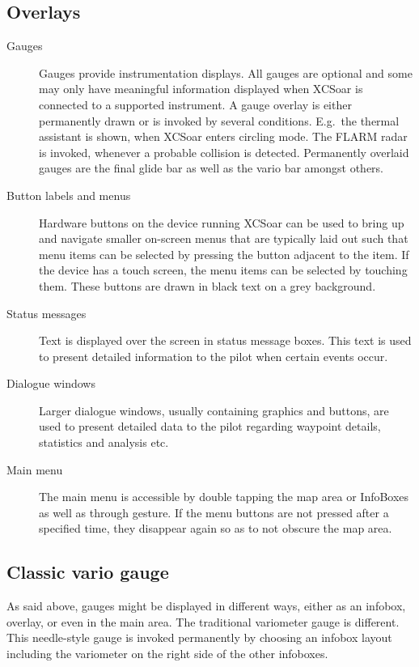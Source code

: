 \subsection*{Overlays}
\begin{description}
\item[Gauges]  Gauges provide instrumentation displays. All gauges are optional
and some may only have meaningful information displayed when XCSoar is
connected to a supported instrument.
A gauge overlay is either permanently drawn or is invoked by several 
conditions.  E.g.\ the thermal assistant is shown, when XCSoar enters circling
mode. The FLARM radar is invoked, whenever a probable collision is detected.
Permanently overlaid gauges are the final glide bar as well as the vario bar
amongst others.
\item[Button labels and menus] Hardware buttons on the device running XCSoar
can be used to bring up and navigate smaller on-screen menus that are
typically laid out such that menu items can be selected by pressing the
button adjacent to the item.  If the device has a touch screen, the menu
items can be selected by touching them.  These buttons are drawn in black
text on a grey background.
\item[Status messages] Text is displayed over the screen in status message
boxes.  This text is used to present detailed information to the pilot when
certain events occur.
\item[Dialogue windows] Larger dialogue windows, usually containing graphics and
buttons, are used to present detailed data to the pilot regarding waypoint
details, statistics and analysis etc.
\item[Main menu] The main menu is accessible by double tapping the map area or
InfoBoxes as well as through gesture. If the menu buttons are not pressed after
 a specified time, they disappear again so as to not obscure 
the map area.
\end{description}

\subsection*{Classic vario gauge}
As said above, gauges might be displayed in different ways, either as an 
infobox, overlay, or even in the main area. The traditional variometer gauge is 
different. This needle-style gauge is invoked permanently by choosing an infobox 
layout including the variometer on the right side of the other infoboxes. 

